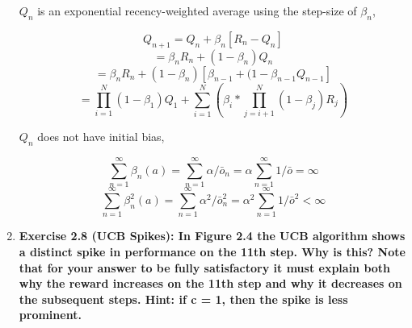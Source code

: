 \documentclass[11pt]{article}
\begin{document}
\begin{enumerate}
		$Q_n$ is an exponential recency-weighted average using the step-size of $\beta_n$,
		
		$$Q_{n+1}=Q_n+\beta_n[R_n-Q_n]$$
		$$=\beta_nR_n+(1-\beta_n)Q_n$$
		$$=\beta_nR_n+(1-\beta_n)[\beta_{n-1}+(1-\beta_{n-1}Q_{n-1}]$$
		$$=\prod_{i=1}^N(1-\beta_1)Q_1 + \sum_{i=1}^N(\beta_i * \prod_{j=i+1}^N(1-\beta_j)R_j)$$
		
		$Q_n$ does not have initial bias,
		
		$$\sum_{n=1}^\infty\beta_n(a)=\sum_{n=1}^\infty\alpha/\bar{o}_n=\alpha\sum_{n=1}^\infty1/\bar{o}=\infty$$
		$$\sum_{n=1}^\infty\beta^2_n(a)=\sum_{n=1}^\infty\alpha^2/\bar{o}^2_n=\alpha^2 \sum_{n=1}^\infty 1/\bar{o}^2<\infty$$
		
		\item \textbf{Exercise 2.8 (UCB Spikes): In Figure 2.4 the UCB algorithm shows a distinct spike in performance on the 11th step. Why is this? Note that for your answer to
		be fully satisfactory it must explain both why the reward increases on the 11th step and why it decreases on the subsequent steps. Hint: if c = 1, then the spike is less
		prominent.}
		
		
		
	\end{enumerate}
	
\end{document}
